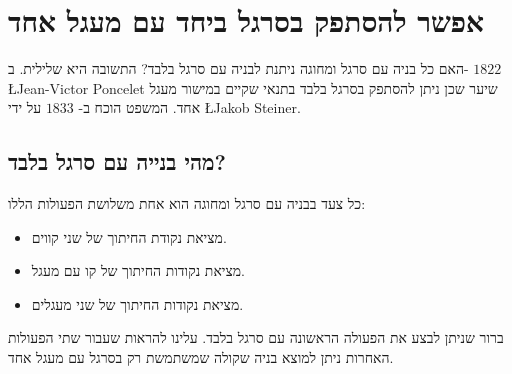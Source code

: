 



\chapter{אפשר להסתפק בסרגל ביחד עם מעגל אחד}\label{c.straightedge}



האם כל בניה עם סרגל ומחוגה ניתנת לבניה עם סרגל בלבד? התשובה היא שלילית. ב-%
$1822$
\L{Jean-Victor Poncelet}
שיער שכן ניתן להסתפק בסרגל בלבד בתנאי שקיים במישור מעגל אחד.
המשפט הוכח ב-%
$1833$
על ידי
\L{Jakob Steiner}.


\section{מהי בנייה עם סרגל בלבד?}

כל צעד בבניה עם סרגל ומחוגה הוא אחת משלושת הפעולות הללו:
\begin{itemize}
\setlength{\itemsep}{0pt}
\item
מציאת נקודת החיתוך של שני קווים.
\item
מציאת נקודות החיתוך של קו עם מעגל.
\item
מציאת נקודות החיתוך של שני מעגלים.
\end{itemize}
ברור שניתן לבצע את הפעולה הראשונה עם סרגל בלבד. עלינו להראות שעבור שתי הפעולות האחרות ניתן למוצא בניה שקולה שמשתמשת רק בסרגל עם מעגל אחד.


